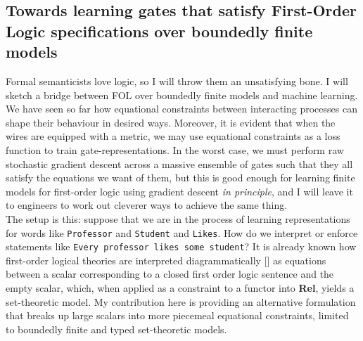 \begin{fullwidth}

\section{Towards learning gates that satisfy First-Order Logic specifications over boundedly finite models}

Formal semanticists love logic, so I will throw them an unsatisfying bone. I will sketch a bridge between FOL over boundedly finite models and machine learning. We have seen so far how equational constraints between interacting processes can shape their behaviour in desired ways. Moreover, it is evident that when the wires are equipped with a metric, we may use equational constraints as a loss function to train gate-representations. In the worst case, we must perform raw stochastic gradient descent across a massive ensemble of gates such that they all satisfy the equations we want of them, but this is good enough for learning finite models for first-order logic using gradient descent \emph{in principle}, and I will leave it to engineers to work out cleverer ways to achieve the same thing.\\

The setup is this: suppose that we are in the process of learning representations for words like \texttt{Professor} and \texttt{Student} and \texttt{Likes}. How do we interpret or enforce statements like \texttt{Every professor likes some student}? It is already known how first-order logical theories are interpreted diagrammatically [] as equations between a scalar corresponding to a closed first order logic sentence and the empty scalar, which, when applied as a constraint to a functor into \textbf{Rel}, yields a set-theoretic model. My contribution here is providing an alternative formulation that breaks up large scalars into more piecemeal equational constraints, limited to boundedly finite and typed set-theoretic models.\\


\end{fullwidth}
